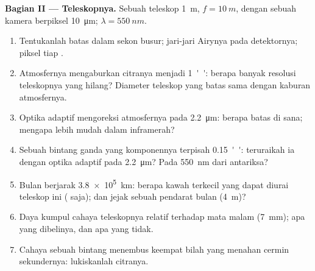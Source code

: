 \begin{problem}
\medskip
\noindent\textbf{Bagian II --- Teleskopnya.}
Sebuah teleskop \qty{1}{m}, $f = \qty{10}{m}$, dengan sebuah kamera berpiksel \qty{10}{\micro m};
$\lambda = \qty{550}{nm}$.
\begin{enumerate}[resume]
  \item Tentukanlah batas  dalam sekon busur; jari-jari Airynya pada
        detektornya; piksel tiap .
  \item Atmosfernya mengaburkan citranya menjadi \qty{1}{''}: berapa banyak resolusi
        teleskopnya yang hilang? Diameter teleskop yang
        batas  sama dengan kaburan atmosfernya.
  \item Optika adaptif mengoreksi atmosfernya pada \qty{2.2}{\micro m}:
        berapa batas  di sana; mengapa lebih mudah dalam inframerah?
  \item Sebuah bintang ganda yang komponennya terpisah \qty{0.15}{''}: teruraikah ia dengan
        optika adaptif pada \qty{2.2}{\micro m}? Pada \qty{550}{nm} dari antariksa?
  \item Bulan berjarak \qty{3.8e5}{km}: berapa kawah terkecil yang dapat diurai
        teleskop ini ( saja); dan jejak sebuah pendarat
        bulan (\qty{4}{m})?
  \item Daya kumpul cahaya teleskopnya relatif terhadap
        mata malam (\qty{7}{mm}); apa yang dibelinya, dan apa yang tidak.
  \item Cahaya sebuah bintang menembus keempat bilah yang menahan
        cermin sekundernya: lukiskanlah citranya.
\end{enumerate}


\end{problem}
